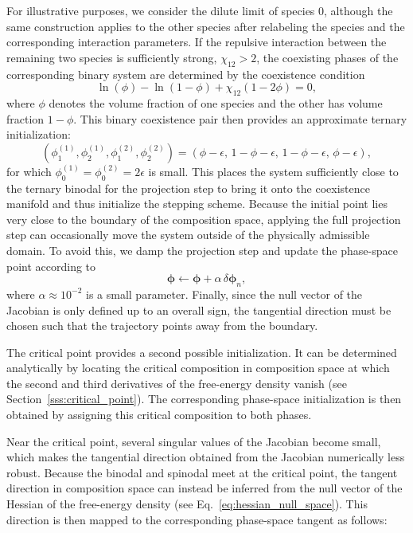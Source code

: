 \documentclass[12pt]{article}
\begin{document}
For illustrative purposes, we consider the dilute limit of species \(0\), although the same construction applies to the other species after relabeling the species and the corresponding interaction parameters.
If the repulsive interaction between the remaining two species is sufficiently strong, \(\chi_{12} > 2\), the coexisting phases of the corresponding binary system are determined by the coexistence condition
\[
\ln(\phi) - \ln(1-\phi) + \chi_{12}(1-2\phi) = 0,
\]
where \(\phi\) denotes the volume fraction of one species and the other has volume fraction \(1-\phi\).
This binary coexistence pair then provides an approximate ternary initialization:
\[
(\phi_1^{(1)}, \phi_2^{(1)}, \phi_1^{(2)}, \phi_2^{(2)})
=
(\phi-\epsilon,\, 1-\phi-\epsilon,\, 1-\phi-\epsilon,\, \phi-\epsilon),
\]
for which \(\phi_0^{(1)} = \phi_0^{(2)} = 2\epsilon\) is small.
This places the system sufficiently close to the ternary binodal for the projection step to bring it onto the coexistence manifold and thus initialize the stepping scheme.
Because the initial point lies very close to the boundary of the composition space, applying the full projection step can occasionally move the system outside of the physically admissible domain.
To avoid this, we damp the projection step and update the phase-space point according to
\[
\boldsymbol{\phi} \leftarrow \boldsymbol{\phi} + \alpha\,\delta\boldsymbol{\phi}_n,
\]
where \(\alpha \approx 10^{-2}\) is a small parameter.
Finally, since the null vector of the Jacobian is only defined up to an overall sign, the tangential direction must be chosen such that the trajectory points away from the boundary.

The critical point provides a second possible initialization.
It can be determined analytically by locating the critical composition in composition space at which the second and third derivatives of the free-energy density vanish (see Section~\ref{sss:critical_point}). The corresponding phase-space initialization is then obtained by assigning this critical composition to both phases.

Near the critical point, several singular values of the Jacobian become small, which makes the tangential direction obtained from the Jacobian numerically less robust.
Because the binodal and spinodal meet at the critical point, the tangent direction in composition space can instead be inferred from the null vector of the Hessian of the free-energy density (see Eq.~\eqref{eq:hessian_null_space}).
This direction is then mapped to the corresponding phase-space tangent as follows:
\end{document}
